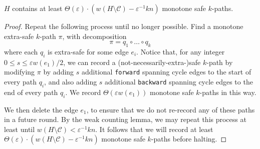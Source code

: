 \documentclass{theoretics}
\newcommand{\eps}{\varepsilon}
\newcommand{\cee}{\mathcal{C}}
\newcommand{\forward}{\texttt{forward}}
\newcommand{\backward}{\texttt{backward}}
\begin{document}
\begin{lemma}  \label{lem:warmupmed}
$H$ contains at least $\Theta(\eps) \cdot \left( w(H \setminus \cee) - \eps^{-1} kn\right)$ monotone safe $k$-paths.
\end{lemma}
\begin{proof}
Repeat the following process until no longer possible.
Find a monotone extra-safe $k$-path $\pi$, with decomposition
$$\pi = q_1 \circ \dots \circ q_k$$
where each $q_i$ is extra-safe for some edge $e_i$.
Notice that, for any integer $0 \le s \le \eps w(e_1)/2$, we can record a (not-necessarily-extra-)safe $k$-path by modifying $\pi$ by adding $s$ additional \forward{} spanning cycle edges to the start of every path $q_i$, and also adding $s$ additional \backward{} spanning cycle edges to the end of every path $q_i$.
We record $\Theta(\eps w(e_1))$ monotone safe $k$-paths in this way.

We then delete the edge $e_1$, to ensure that we do not re-record any of these paths in a future round.
By the weak counting lemma, we may repeat this process at least until $w(H \setminus \cee) < \eps^{-1} kn$.
It follows that we will record at least $\Theta(\eps) \cdot \left(w(H \setminus \cee) - \eps^{-1} kn\right)$ monotone safe $k$-paths before halting.
\end{proof}
\end{document}
